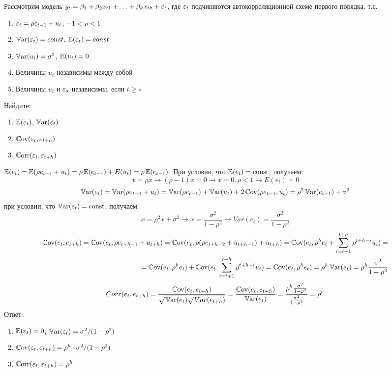\begin{problem}
Рассмотрим модель $y_t=\beta_1+\beta_2 x_{t1}+\ldots+\beta_k x_{tk}+\e_t$, где $\e_t$ подчиняются автокорреляционной схеме первого порядка, т.е.
\begin{enumerate}
\item $\e_t=\rho \e_{t-1}+u_t$, $-1<\rho<1$
\item $\Var(\e_t)=const$, $\E(\e_t)=const$
\item $\Var(u_t)=\sigma^2$, $\E(u_t)=0$
\item Величины $u_t$ независимы между собой
\item Величины $u_t$ и $\e_s$ независимы, если $t\geq s$
\end{enumerate}
Найдите:
\begin{enumerate}
\item $\E(\e_t)$, $\Var(\e_t)$
\item $\Cov(\e_t,\e_{t+h})$
\item $\Corr(\e_t,\e_{t+h})$
\end{enumerate}

\begin{sol}
$
\E(e_t) = \E(\rho e_{t-1}+u_t) = \rho \E( e_{t-1})+E(u_t) = \rho \E( e_{t-1})$. При условии, что $\E(e_t)=\text{const}$, получаем:
\[
x = \rho x \rightarrow (\rho - 1)x = 0 \rightarrow x = 0, \rho < 1 \rightarrow E(e_t) = 0
\]
\[
\Var(e_t) = \Var(\rho e_{t-1}+u_t) = \Var(\rho e_{t-1})+ \Var(u_t) + 2\Cov(\rho e_{t-1}, u_t) = \rho^2 \Var(e_{t-1})+ \sigma^2 
\]
при условии, что $\Var(e_t)=\text{const}$, получаем:
\[
x = \rho^2 x + \sigma^2 \rightarrow x = \frac{\sigma^2}{1 - \rho^2} \rightarrow Var(e_t) = \frac{\sigma^2}{1 - \rho^2}
\]
\begin{align*} 
\Cov(e_t,e_{t+h}) = \Cov(e_t,\rho e_{t+h-1}+u_{t+h}) =
\Cov(e_t,\rho (\rho e_{t+h-2}+u_{t+h-1})+u_{t+h}) = \Cov(e_t,\rho^{h} e_{t}+\sum_{i=t+1}^{t+h} \rho^{t+h-i}u_{i}) = \\
= \Cov(e_t,\rho^{h} e_{t})+\Cov(e_t, \sum_{i=t+1}^{t+h} \rho^{t+h-i}u_{i}) = \Cov(e_t,\rho^{h} e_{t}) = \rho^{h} \Var(e_t) =
\rho^{h} \frac{\sigma^2}{1 - \rho^2}
\end{align*}
\[
Corr(e_t, e_{t+h}) = \frac{\Cov(e_t,e_{t+h})}{\sqrt{\Var(e_t)} \sqrt{Var(e_{t+h})}} = \frac{\Cov(e_t,e_{t+h})}{\Var(e_t)} = \frac{\rho^{h} \frac{\sigma^2}{1 - \rho^2}}{\frac{\sigma^2}{1 - \rho^2}} = \rho^{h}
\]
Ответ:
\begin{enumerate}
\item $\E(\e_t)=0$, $\Var(\e_t)=\sigma^2/(1-\rho^2)$
\item $\Cov(\e_t,\e_{t+h})=\rho^h\cdot \sigma^2/(1-\rho^2)$
\item $\Corr(\e_t,\e_{t+h})=\rho^h$
\end{enumerate}
\end{sol}
\end{problem}



